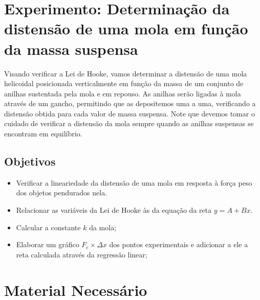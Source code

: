 
\section{Experimento: Determinação da distensão de uma mola em função da massa suspensa}

Visando verificar a Lei de Hooke, vamos determinar a distensão de uma mola helicoidal posicionada verticalmente em função da massa de um conjunto de anilhas sustentada pela mola e em repouso. As anilhas serão ligadas à mola através de um gancho, permitindo que as depositemos uma a uma, verificando a distensão obtida para cada valor de massa suspensa. Note que devemos tomar o cuidado de verificar a distensão da mola sempre quando as anilhas suspensas se encontram em equilíbrio.

\subsection{Objetivos}

\begin{itemize}
     \item Verificar a lineariedade da distensão de uma mola em resposta à força peso dos objetos pendurados nela.
	 \item Relacionar as variáveis da Lei de Hooke às da equação da reta $y = A + Bx$.
     \item Calcular a constante $k$ da mola;
     \item Elaborar um gráfico $F_e \times \Delta x$ dos pontos experimentais e adicionar a ele a reta calculada através da regressão linear;
\end{itemize}

\section{Material Necessário}

